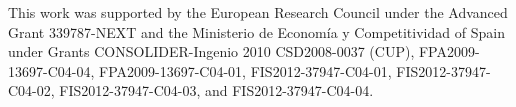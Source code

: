 \documentclass{JINST}
\begin{document}
\acknowledgments

This work was supported by the European Research Council under the Advanced Grant 339787-NEXT and the Ministerio de Econom\'{i}a y Competitividad of Spain under Grants CONSOLIDER-Ingenio 2010 CSD2008-0037 (CUP), FPA2009-13697-C04-04, FPA2009-13697-C04-01, FIS2012-37947-C04-01, FIS2012-37947-C04-02, FIS2012-37947-C04-03, and FIS2012-37947-C04-04.



\end{document}

